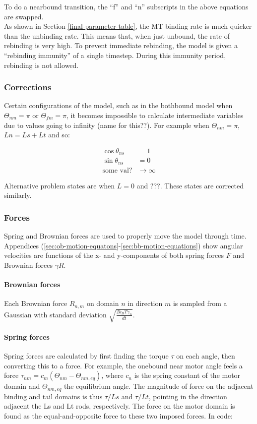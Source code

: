 \documentclass[10pt]{article} %
\begin{document}
To do a nearbound transition, the ``f'' and ``n'' subscripts in the above equations are swapped.\\

As shown in Section \ref{final-parameter-table}, the MT binding rate is much quicker than the unbinding rate. This means that, when just unbound, the rate of rebinding is very high. To prevent immediate rebinding, the model is given a ``rebinding immunity'' of a single timestep. During this immunity period, rebinding is not allowed.\\

\subsubsection{Corrections}
\label{corrections-section}
Certain configurations of the model, such as in the bothbound model when $\Theta_{nm} = \pi$ or $\Theta_{fm} = \pi$, it becomes impossible to calculate intermediate variables due to values going to infinity (name for this??). For example when $\Theta_{nm} = \pi$, $Ln = Ls + Lt$ and so:

\begin{align}
  \cos\theta_{ns} &= 1 \\
  \sin\theta_{ns} &= 0 \\
  \mbox{some val?} &\rightarrow \infty
\end{align}

Alternative problem states are when $L = 0$ and ???. These states are corrected similarly.\\

\subsubsection{Forces}
Spring and Brownian forces are used to properly move the model through time. Appendices (\ref{sec:ob-motion-equatons}-\ref{sec:bb-motion-equations}) show angular velocities are functions of the x- and y-components of both spring forces $F$ and Brownian forces $\gamma R$.

\paragraph{Brownian forces}
Each Brownian force $R_{n,m}$ on domain $n$ in direction $m$ is sampled from a Gaussian with standard deviation $\sqrt{\frac{2k_BT\gamma_n}{dt}}$.\\

\paragraph{Spring forces}
Spring forces are calculated by first finding the torque $\tau$ on each angle, then converting this to a force. For example, the onebound near motor angle feels a force $\tau_{nm} = c_m(\Theta_{nm}-\Theta_{nm,eq})$, where $c_n$ is the spring constant of the motor domain and $\Theta_{nm,eq}$ the equilibrium angle. The magnitude of force on the adjacent binding and tail domains is thus $\tau/Ls$ and $\tau/Lt$, pointing in the direction adjacent the Ls and Lt rods, respectively. The force on the motor domain is found as the equal-and-opposite force to these two imposed forces. In code:
\end{document}
